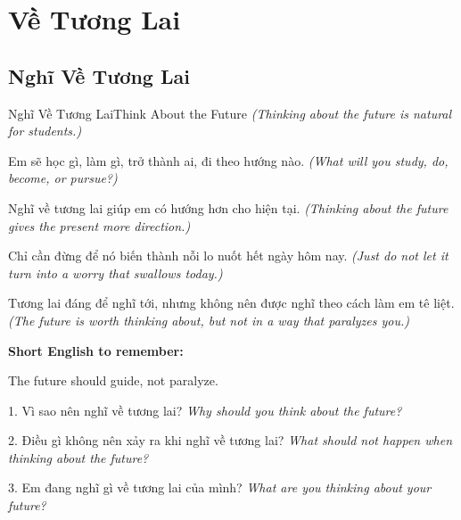 \chapter{Về Tương Lai}

\section{Nghĩ Về Tương Lai}
\begin{truyen}{Nghĩ Về Tương Lai}{Think About the Future}
\textit{(Thinking about the future is natural for students.)}

Em sẽ học gì, làm gì, trở thành ai, đi theo hướng nào.
\textit{(What will you study, do, become, or pursue?) }

Nghĩ về tương lai giúp em có hướng hơn cho hiện tại.
\textit{(Thinking about the future gives the present more direction.)}

Chỉ cần đừng để nó biến thành nỗi lo nuốt hết ngày hôm nay.
\textit{(Just do not let it turn into a worry that swallows today.)}
\end{truyen}

\begin{baihoc}
Tương lai đáng để nghĩ tới, nhưng không nên được nghĩ theo cách làm em tê liệt.
\textit{(The future is worth thinking about, but not in a way that paralyzes you.)}
\end{baihoc}

\begin{ghinhoanh}
\textbf{Short English to remember:}

The future should guide, not paralyze.

\end{ghinhoanh}

\begin{tuhocnhanh}
1. Vì sao nên nghĩ về tương lai? \textit{Why should you think about the future?}

2. Điều gì không nên xảy ra khi nghĩ về tương lai? \textit{What should not happen when thinking about the future?}

3. Em đang nghĩ gì về tương lai của mình? \textit{What are you thinking about your future?}
\end{tuhocnhanh}
\ngancach

